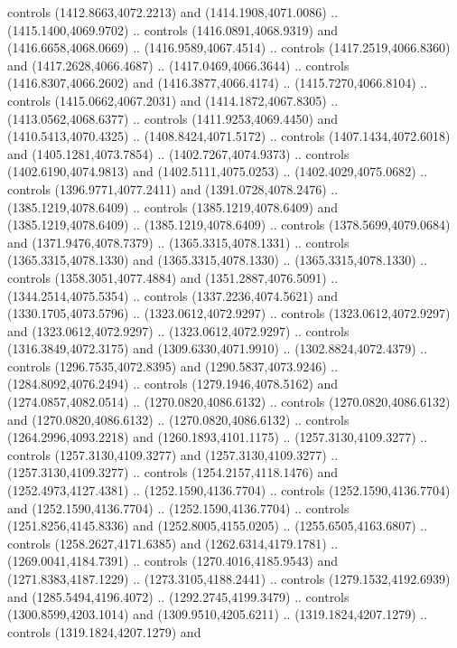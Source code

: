 \begin{scope}[shift={(-343.28256,-575.56596)}]
\begin{scope}[shift={(-736.04956,-3272.8657)}]
      controls (1412.8663,4072.2213) and (1414.1908,4071.0086) ..
      (1415.1400,4069.9702) .. controls (1416.0891,4068.9319) and
      (1416.6658,4068.0669) .. (1416.9589,4067.4514) .. controls
      (1417.2519,4066.8360) and (1417.2628,4066.4687) .. (1417.0469,4066.3644) ..
      controls (1416.8307,4066.2602) and (1416.3877,4066.4174) ..
      (1415.7270,4066.8104) .. controls (1415.0662,4067.2031) and
      (1414.1872,4067.8305) .. (1413.0562,4068.6377) .. controls
      (1411.9253,4069.4450) and (1410.5413,4070.4325) .. (1408.8424,4071.5172) ..
      controls (1407.1434,4072.6018) and (1405.1281,4073.7854) ..
      (1402.7267,4074.9373) .. controls (1402.6190,4074.9813) and
      (1402.5111,4075.0253) .. (1402.4029,4075.0682) .. controls
      (1396.9771,4077.2411) and (1391.0728,4078.2476) .. (1385.1219,4078.6409) ..
      controls (1385.1219,4078.6409) and (1385.1219,4078.6409) ..
      (1385.1219,4078.6409) .. controls (1378.5699,4079.0684) and
      (1371.9476,4078.7379) .. (1365.3315,4078.1331) .. controls
      (1365.3315,4078.1330) and (1365.3315,4078.1330) .. (1365.3315,4078.1330) ..
      controls (1358.3051,4077.4884) and (1351.2887,4076.5091) ..
      (1344.2514,4075.5354) .. controls (1337.2236,4074.5621) and
      (1330.1705,4073.5796) .. (1323.0612,4072.9297) .. controls
      (1323.0612,4072.9297) and (1323.0612,4072.9297) .. (1323.0612,4072.9297) ..
      controls (1316.3849,4072.3175) and (1309.6330,4071.9910) ..
      (1302.8824,4072.4379) .. controls (1296.7535,4072.8395) and
      (1290.5837,4073.9246) .. (1284.8092,4076.2494) .. controls
      (1279.1946,4078.5162) and (1274.0857,4082.0514) .. (1270.0820,4086.6132) ..
      controls (1270.0820,4086.6132) and (1270.0820,4086.6132) ..
      (1270.0820,4086.6132) .. controls (1264.2996,4093.2218) and
      (1260.1893,4101.1175) .. (1257.3130,4109.3277) .. controls
      (1257.3130,4109.3277) and (1257.3130,4109.3277) .. (1257.3130,4109.3277) ..
      controls (1254.2157,4118.1476) and (1252.4973,4127.4381) ..
      (1252.1590,4136.7704) .. controls (1252.1590,4136.7704) and
      (1252.1590,4136.7704) .. (1252.1590,4136.7704) .. controls
      (1251.8256,4145.8336) and (1252.8005,4155.0205) .. (1255.6505,4163.6807) ..
      controls (1258.2627,4171.6385) and (1262.6314,4179.1781) ..
      (1269.0041,4184.7391) .. controls (1270.4016,4185.9543) and
      (1271.8383,4187.1229) .. (1273.3105,4188.2441) .. controls
      (1279.1532,4192.6939) and (1285.5494,4196.4072) .. (1292.2745,4199.3479) ..
      controls (1300.8599,4203.1014) and (1309.9510,4205.6211) ..
      (1319.1824,4207.1279) .. controls (1319.1824,4207.1279) and

\end{scope}
\end{scope}
